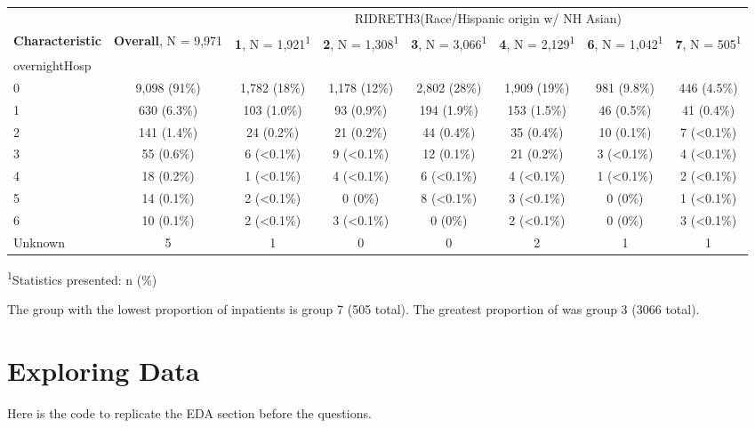 \documentclass[]{article}
\begin{document}
\captionsetup[table]{labelformat=empty,skip=1pt}
\begin{longtable}{lccccccc}
\toprule
& & \multicolumn{6}{c}{RIDRETH3(Race/Hispanic origin w/ NH Asian)} \\ 
 \cmidrule(lr){3-8}
\textbf{Characteristic} & \textbf{Overall}, N = 9,971 & \textbf{1}, N = 1,921\textsuperscript{1} & \textbf{2}, N = 1,308\textsuperscript{1} & \textbf{3}, N = 3,066\textsuperscript{1} & \textbf{4}, N = 2,129\textsuperscript{1} & \textbf{6}, N = 1,042\textsuperscript{1} & \textbf{7}, N = 505\textsuperscript{1} \\ 
\midrule
overnightHosp &  &  &  &  &  &  &  \\ 
0 & 9,098 (91\%) & 1,782 (18\%) & 1,178 (12\%) & 2,802 (28\%) & 1,909 (19\%) & 981 (9.8\%) & 446 (4.5\%) \\ 
1 & 630 (6.3\%) & 103 (1.0\%) & 93 (0.9\%) & 194 (1.9\%) & 153 (1.5\%) & 46 (0.5\%) & 41 (0.4\%) \\ 
2 & 141 (1.4\%) & 24 (0.2\%) & 21 (0.2\%) & 44 (0.4\%) & 35 (0.4\%) & 10 (0.1\%) & 7 (<0.1\%) \\ 
3 & 55 (0.6\%) & 6 (<0.1\%) & 9 (<0.1\%) & 12 (0.1\%) & 21 (0.2\%) & 3 (<0.1\%) & 4 (<0.1\%) \\ 
4 & 18 (0.2\%) & 1 (<0.1\%) & 4 (<0.1\%) & 6 (<0.1\%) & 4 (<0.1\%) & 1 (<0.1\%) & 2 (<0.1\%) \\ 
5 & 14 (0.1\%) & 2 (<0.1\%) & 0 (0\%) & 8 (<0.1\%) & 3 (<0.1\%) & 0 (0\%) & 1 (<0.1\%) \\ 
6 & 10 (0.1\%) & 2 (<0.1\%) & 3 (<0.1\%) & 0 (0\%) & 2 (<0.1\%) & 0 (0\%) & 3 (<0.1\%) \\ 
Unknown & 5 & 1 & 0 & 0 & 2 & 1 & 1 \\ 
\bottomrule
\end{longtable}
\vspace{-5mm}
\begin{minipage}{\linewidth}
\textsuperscript{1}Statistics presented: n (\%) \\ 
\end{minipage}

The group with the lowest proportion of inpatients is group 7 (505
total). The greatest proportion of was group 3 (3066 total).

\hypertarget{exploring-data}{%
\section{Exploring Data}\label{exploring-data}}

Here is the code to replicate the EDA section before the questions.
\end{document}
